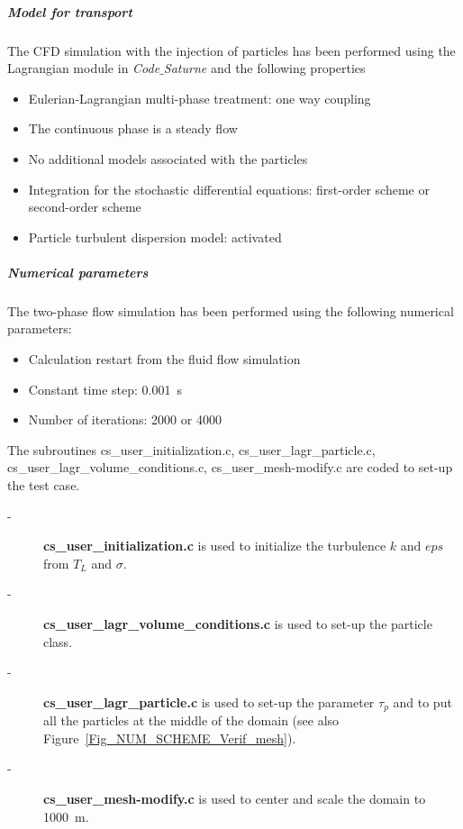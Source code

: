 \subparagraph{Model for transport} The CFD simulation with the injection of particles has been performed using the Lagrangian module in \textit{Code$\_$Saturne} and the following properties
\begin{itemize}
 \item Eulerian-Lagrangian multi-phase treatment: one way coupling
 \item The continuous phase is a steady flow
 \item No additional models associated with the particles
 \item Integration for the stochastic differential equations: first-order scheme or second-order scheme
 \item Particle turbulent dispersion model: activated
\end{itemize}
\subparagraph{Numerical parameters} The two-phase flow simulation has been performed using the following numerical parameters:
\begin{itemize}
 \item Calculation restart from the fluid flow simulation
 \item Constant time step: \SI{0.001}{s}
 \item Number of iterations: \SI{2000}{} or \SI{4000}{}
\end{itemize}



The subroutines cs\_user\_initialization.c, cs\_user\_lagr\_particle.c, cs\_user\_lagr\_volume\_conditions.c, cs\_user\_mesh-modify.c are coded to set-up the test case.

\begin{description}

   \item[-] \textbf{cs\_user\_initialization.c} is used to initialize the turbulence $k$ and $eps$ from $T_L$ and $\sigma$.
   \item[-] \textbf{cs\_user\_lagr\_volume\_conditions.c} is used to set-up the particle class.
   \item[-] \textbf{cs\_user\_lagr\_particle.c} is used to set-up the parameter $\tau_p$ and to put all the particles at the middle of the domain (see also Figure~\ref{Fig_NUM_SCHEME_Verif_mesh}).
   \item[-] \textbf{cs\_user\_mesh-modify.c} is used to center and scale the domain to \SI{1000}{m}.

\end{description}

